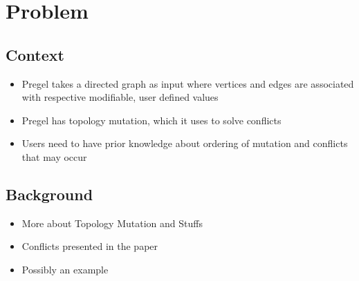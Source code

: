 \section{Problem}
\subsection{Context}
\begin{frame}
\begin{itemize}
  \item Pregel takes a directed graph as input where vertices and edges are associated with respective modifiable, user defined values
  \item Pregel has topology mutation, which it uses to solve conflicts
  \item Users need to have prior knowledge about ordering of mutation and conflicts that may occur
\end{itemize}
\end{frame}

\subsection{Background}
\begin{frame}
\begin{itemize}
  \item More about Topology Mutation and Stuffs
  \item Conflicts presented in the paper
  \item Possibly an example
\end{itemize}
\end{frame}

